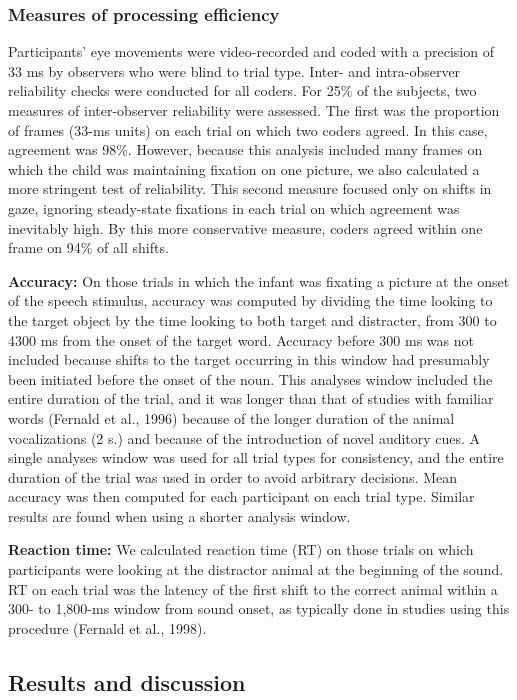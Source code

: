 \documentclass[english,floatsintext,man]{apa6}
\theoremstyle{definition}
\theoremstyle{definition}
\theoremstyle{definition}
\theoremstyle{remark}
\begin{document}
\subsubsection{Measures of processing
efficiency}\label{measures-of-processing-efficiency}

Participants' eye movements were video-recorded and coded with a
precision of 33 ms by observers who were blind to trial type. Inter- and
intra-observer reliability checks were conducted for all coders. For
25\% of the subjects, two measures of inter-observer reliability were
assessed. The first was the proportion of frames (33-ms units) on each
trial on which two coders agreed. In this case, agreement was 98\%.
However, because this analysis included many frames on which the child
was maintaining fixation on one picture, we also calculated a more
stringent test of reliability. This second measure focused only on
shifts in gaze, ignoring steady-state fixations in each trial on which
agreement was inevitably high. By this more conservative measure, coders
agreed within one frame on 94\% of all shifts.

\textbf{Accuracy:} On those trials in which the infant was fixating a
picture at the onset of the speech stimulus, accuracy was computed by
dividing the time looking to the target object by the time looking to
both target and distracter, from 300 to 4300 ms from the onset of the
target word. Accuracy before 300 ms was not included because shifts to
the target occurring in this window had presumably been initiated before
the onset of the noun. This analyses window included the entire duration
of the trial, and it was longer than that of studies with familiar words
(Fernald et al., 1996) because of the longer duration of the animal
vocalizations (2 s.) and because of the introduction of novel auditory
cues. A single analyses window was used for all trial types for
consistency, and the entire duration of the trial was used in order to
avoid arbitrary decisions. Mean accuracy was then computed for each
participant on each trial type. Similar results are found when using a
shorter analysis window.

\textbf{Reaction time:} We calculated reaction time (RT) on those trials
on which participants were looking at the distractor animal at the
beginning of the sound. RT on each trial was the latency of the first
shift to the correct animal within a 300- to 1,800-ms window from sound
onset, as typically done in studies using this procedure (Fernald et
al., 1998).

\subsection{Results and discussion}\label{results-and-discussion}
\end{document}
